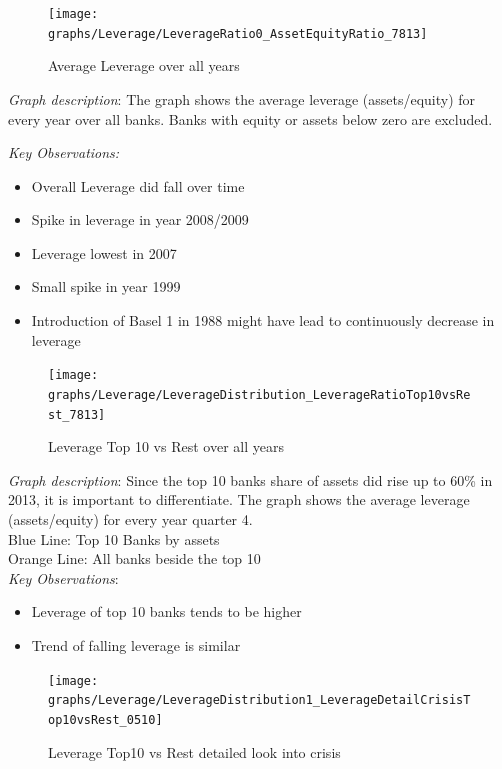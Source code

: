 \documentclass[12pt, a4paper]{article} %
\begin{document}
\begin{figure}[hbtp]
\centering
\caption{Average Leverage over all years}
\texttt{[image: graphs/Leverage/LeverageRatio0\_AssetEquityRatio\_7813]}
\end{figure}

\noindent \textit{Graph description}: The graph shows the average leverage (assets/equity) for every year over all banks. Banks with equity or assets below zero are excluded.


\noindent \textit{Key Observations:}
\begin{itemize}
\item Overall Leverage did fall over time
\item Spike in leverage in year 2008/2009
\item Leverage lowest in 2007
\item Small spike in year 1999
\item Introduction of Basel 1 in 1988 might have lead to continuously decrease in leverage
\end{itemize}


\begin{figure}[hbtp]
\centering
\caption{Leverage Top 10 vs Rest over all years}
\texttt{[image: graphs/Leverage/LeverageDistribution\_LeverageRatioTop10vsRest\_7813]}
\end{figure}


\newpage

\noindent \textit{Graph description}: Since the top 10 banks share of assets did rise up to 60\% in 2013, it is important to differentiate. The graph shows the average leverage (assets/equity) for every year quarter 4.\\ Blue Line: Top 10 Banks by assets\\
Orange Line: All banks beside the top 10\\

\noindent \textit{Key Observations}:
\begin{itemize}
\item Leverage of top 10 banks tends to be higher
\item Trend of falling leverage is similar
\end{itemize}




\begin{figure}[hbtp]
\centering
\caption{Leverage Top10 vs Rest detailed look into crisis}
\texttt{[image: graphs/Leverage/LeverageDistribution1\_LeverageDetailCrisisTop10vsRest\_0510]}
\end{figure}
\end{document}
